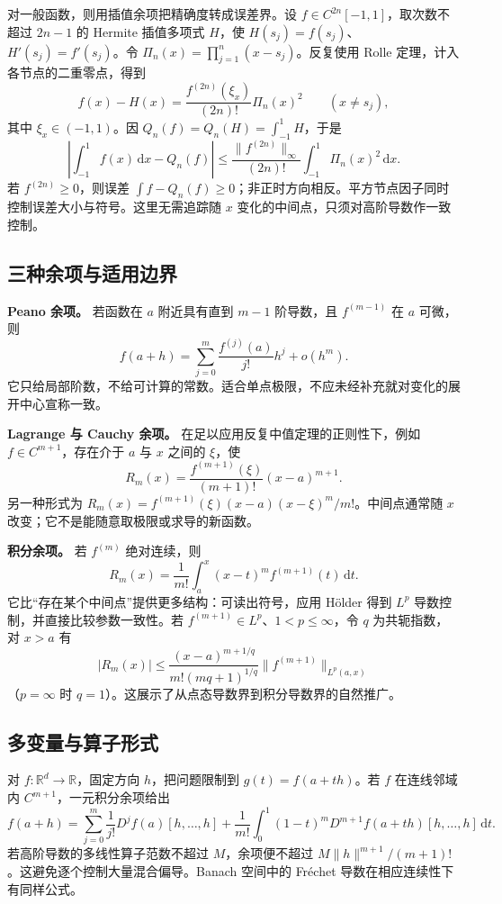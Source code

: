 \documentclass[UTF8,12pt,a4paper,fontset=fandol]{ctexart}
\begin{document}
对一般函数，则用插值余项把精确度转成误差界。设 $f\in C^{2n}[-1,1]$，取次数不超过 $2n-1$ 的 Hermite 插值多项式 $H$，使 $H(s_j)=f(s_j)$、$H'(s_j)=f'(s_j)$。令 $\Pi_n(x)=\prod_{j=1}^n(x-s_j)$。反复使用 Rolle 定理，计入各节点的二重零点，得到
\[
f(x)-H(x)=\frac{f^{(2n)}(\xi_x)}{(2n)!}\Pi_n(x)^2
\qquad(x\ne s_j),
\]
其中 $\xi_x\in(-1,1)$。因 $Q_n(f)=Q_n(H)=\int_{-1}^1H$，于是
\[
\left|\int_{-1}^1f(x)\,\mathrm dx-Q_n(f)\right|
\le\frac{\|f^{(2n)}\|_\infty}{(2n)!}
\int_{-1}^1\Pi_n(x)^2\,\mathrm dx.
\]
若 $f^{(2n)}\ge0$，则误差 $\int f-Q_n(f)\ge0$；非正时方向相反。平方节点因子同时控制误差大小与符号。这里无需追踪随 $x$ 变化的中间点，只须对高阶导数作一致控制。

\subsection{三种余项与适用边界}

\label{app:taylor-forms}

\textbf{Peano 余项。} 若函数在 $a$ 附近具有直到 $m-1$ 阶导数，且 $f^{(m-1)}$ 在 $a$ 可微，则
\[
f(a+h)=\sum_{j=0}^m\frac{f^{(j)}(a)}{j!}h^j+o(h^m).
\]
它只给局部阶数，不给可计算的常数。适合单点极限，不应未经补充就对变化的展开中心宣称一致。

\textbf{Lagrange 与 Cauchy 余项。} 在足以应用反复中值定理的正则性下，例如 $f\in C^{m+1}$，存在介于 $a$ 与 $x$ 之间的 $\xi$，使
\[
R_m(x)=\frac{f^{(m+1)}(\xi)}{(m+1)!}(x-a)^{m+1}.
\]
另一种形式为 $R_m(x)=f^{(m+1)}(\xi)(x-a)(x-\xi)^m/m!$。中间点通常随 $x$ 改变；它不是能随意取极限或求导的新函数。

\textbf{积分余项。} 若 $f^{(m)}$ 绝对连续，则
\[
R_m(x)=\frac1{m!}\int_a^x(x-t)^mf^{(m+1)}(t)\,\mathrm dt.
\]
它比“存在某个中间点”提供更多结构：可读出符号，应用 Hölder 得到 $L^p$ 导数控制，并直接比较参数一致性。若 $f^{(m+1)}\in L^p$、$1<p\leq\infty$，令 $q$ 为共轭指数，对 $x>a$ 有
\[
|R_m(x)|\leq\frac{(x-a)^{m+1/q}}{m!(mq+1)^{1/q}}
\|f^{(m+1)}\|_{L^p(a,x)}
\]
（$p=\infty$ 时 $q=1$）。这展示了从点态导数界到积分导数界的自然推广。

\subsection{多变量与算子形式}

\label{app:taylor-multivariable}

对 $f:\mathbb R^d\to\mathbb R$，固定方向 $h$，把问题限制到 $g(t)=f(a+th)$。若 $f$ 在连线邻域内 $C^{m+1}$，一元积分余项给出
\[
f(a+h)=\sum_{j=0}^m\frac1{j!}D^jf(a)[h,\ldots,h]
+\frac1{m!}\int_0^1(1-t)^mD^{m+1}f(a+th)[h,\ldots,h]\,\mathrm dt.
\]
若高阶导数的多线性算子范数不超过 $M$，余项便不超过 $M\|h\|^{m+1}/(m+1)!$。这避免逐个控制大量混合偏导。Banach 空间中的 Fréchet 导数在相应连续性下有同样公式。
\end{document}
